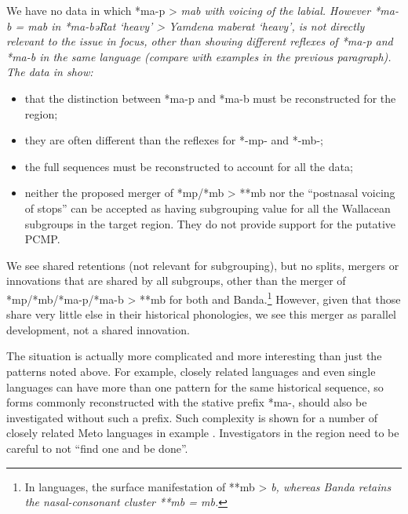We have no data in which *ma-p > \it{mab} with voicing of the labial.
However *ma-b = \it{mab} in *ma-bəRat ‘heavy’ > Yamdena \it{maberat}
‘heavy’, is not directly relevant to the issue in focus,
other than showing different reflexes of *ma-p
and *ma-b in the same language (compare with examples in the previous paragraph).
The data in  show:

\begin{itemize}
	\item[a.]	that the distinction between *ma-p
						and *ma-b must be reconstructed for the region;
	\item[b.]	they are often different than the reflexes for *-mp-
						and *-mb-;
	\item[c.]	the full sequences must be reconstructed to
						account for all the data;
	\item[d.]	neither the proposed merger of *mp/*mb > **mb nor the “postnasal
						voicing of stops” can be accepted as having subgrouping value
						for all the Wallacean subgroups in the target region.
						They do not provide support for the putative PCMP.
\end{itemize}

We see shared retentions (not relevant for subgrouping),
but no splits, mergers or innovations that are shared by all
subgroups, other than the merger of
*mp/*mb/*ma-p/*ma-b > **mb for both  and Banda.\footnote{
		In  languages, the surface manifestation of **mb > \it{b},
		whereas Banda retains the nasal-consonant cluster **mb = \it{mb}.}
However, given that those share very little
else in their historical phonologies,
we see this merger as parallel development,
not a shared innovation.

The situation is actually more complicated
and more interesting than just the patterns noted above.
For example, closely related languages
and even single languages can have more than one pattern for
the same historical sequence,
so forms commonly reconstructed with the stative prefix *ma-,
should also be investigated without such a prefix.
Such complexity is shown for a number of closely related Meto
languages in example .
Investigators in the region need to be careful to not “find one and be done”.

